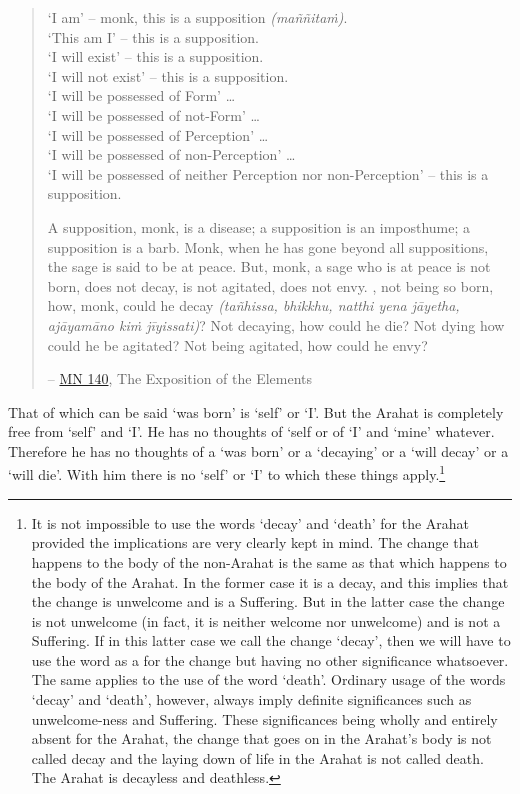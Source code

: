 \begin{quote}
`I am' -- monk, this is a supposition \emph{(maññitaṁ)}.\\
`This am I' -- this is a supposition.\\
`I will exist' -- this is a supposition.\\
`I will not exist' -- this is a supposition.\\
`I will be possessed of Form' \ldots{}\\
`I will be possessed of not-Form' \ldots{}\\
`I will be possessed of Perception' \ldots{}\\
`I will be possessed of non-Perception' \ldots{}\\
`I will be possessed of neither Perception nor non-Perception' -- this is a supposition.

A supposition, monk, is a disease; a supposition is an imposthume; a supposition is a barb. Monk, when he has gone beyond all suppositions, the sage is said to be at peace. But, monk, a sage who is at peace is not born, does not decay, is not agitated, does not envy. , not being so born, how, monk, could he decay \emph{(tañhissa, bhikkhu, natthi yena jāyetha, ajāyamāno kiṁ jīyissati)}? Not decaying, how could he die? Not dying how could he be agitated? Not being agitated, how could he envy?

 -- \href{https://suttacentral.net/mn140/en/bodhi}{MN 140}, The Exposition of the Elements
\end{quote}

That of which can be said `was born' is `self' or `I'. But the Arahat is completely free from `self' and `I'. He has no thoughts of `self or of `I' and `mine' whatever. Therefore he has no thoughts of a `was born' or a `decaying' or a `will decay' or a `will die'. With him there is no `self' or `I' to which  these things apply.\footnote{It is not impossible to use the words `decay' and `death' for the Arahat provided the implications are very clearly kept in mind. The change that happens to the body of the non-Arahat is the same as that which happens to the body of the Arahat. In the former case it is a decay, and this implies that the change is unwelcome and is a Suffering. But in the latter case the change is not unwelcome (in fact, it is neither welcome nor unwelcome) and is not a Suffering. If in this latter case we call the change `decay', then we will have to use the word  as a  for the change but having no other significance whatsoever. The same applies to the use of the word `death'. Ordinary usage of the words `decay' and `death', however, always imply definite significances such as unwelcome-ness and Suffering. These significances being wholly and entirely absent for the Arahat, the change that goes on in the Arahat's body is not called decay and the laying down of life in the Arahat is not called death. The Arahat is decayless and deathless.}

